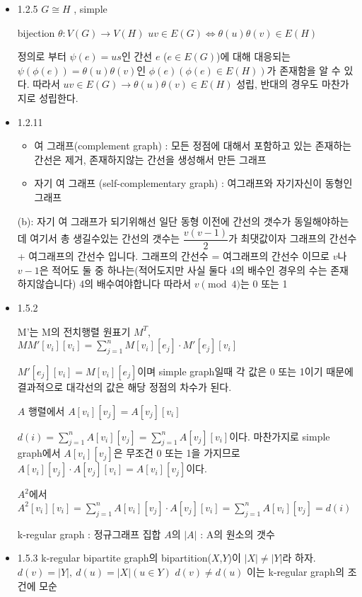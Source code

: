 \documentclass{oblivoir}
\begin{document}
\begin{itemize}
    \item 1.2.5
    $G \cong H$ , simple

    bijection $\theta : V(G) \longrightarrow V(H)$
    $ uv \in E(G) \Leftrightarrow  \theta(u)\theta(v) \in E(H)$

    정의로 부터 $\psi(e) = us$인 간선 $e$ ($e \in E(G)$)에 대해 대응되는 $\psi(\phi(e)) = \theta(u)\theta(v)$인 $\phi(e)(\phi(e) \in E(H))$가 존재함을 알 수 있다. 따라서 $ uv \in E(G) \rightarrow \theta(u)\theta(v) \in E(H)$ 성립, 반대의 경우도 마찬가지로 성립한다.
    \item 1.2.11
    \begin{itemize}
        \item 여 그래프(complement graph) : 모든 정점에 대해서 포함하고 있는 존재하는 간선은 제거, 존재하지않는 간선을 생성해서 만든 그래프
        \item 자기 여 그래프 (self-complementary graph) : 여그래프와 자기자신이 동형인 그래프
    \end{itemize}
    (b): 자기 여 그래프가 되기위해선 일단 동형 이전에 간선의 갯수가 동일해야하는데 여기서 총 생길수있는 간선의 갯수는 
$\dfrac{v(v-1)}{2}$가 최댓값이자 그래프의 간선수 + 여그래프의 간선수 입니다. 그래프의 간선수 = 여그래프의 간선수 이므로 $v$나 $v-1$은 적어도 둘 중 하나는(적어도지만 사실 둘다 4의 배수인 경우의 수는 존재하지않습니다) 4의 배수여야합니다
    따라서 $v\pmod{4}$는 0 또는 1
    
    \item 1.5.2

    M'는 M의 전치행렬 원표기 $M^{T}$,
    $MM'[v_i][v_i] = \sum_{j=1}^n M[v_i][e_j] \cdot M'[e_j][v_i]$

    $ M'[e_j][v_i] = M[v_i][e_j] $이며 simple graph일때 각 값은 0 또는 1이기 때문에 결과적으로 대각선의 값은 해당 정점의 차수가 된다.

    $A$ 행렬에서 $A[v_i][v_j] = A[v_j][v_i]$ 

    $d(i) = \sum_{j=1}^n A[v_i][v_j] = \sum_{j=1}^n A[v_j][v_i]$이다.
    마찬가지로 simple graph에서 $A[v_i][v_j]$은 무조건 0 또는 1을 가지므로 $A[v_i][v_j] \cdot A[v_j][v_i] = A[v_i][v_j]$이다.

    $A^2$에서 $A^2[v_i][v_i] = \sum_{j=1}^n A[v_i][v_j] \cdot A[v_j][v_i]= \sum_{j=1}^n A[v_i][v_j] = d(i)$

    k-regular graph : 정규그래프
    집합 $A$의 $|A|$ : A의 원소의 갯수

    \item 1.5.3
    k-regular bipartite graph의 bipartition($X$,$Y$)이 $|X|\neq |Y|$라 하자. $d(v)=|Y|,\: d(u)=|X|(u \in Y )$ $d(v) \neq d(u)$ 이는 k-regular graph의 조건에 모순


\end{itemize}
\end{document}
